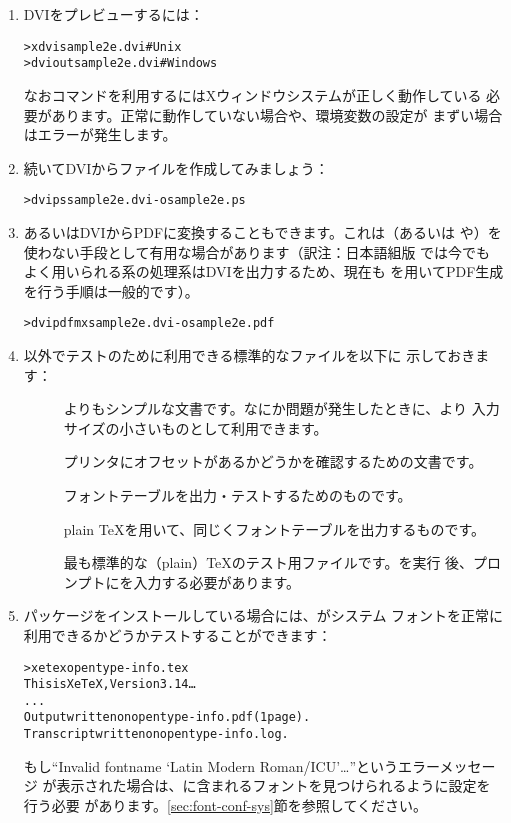 \documentclass[uplatex,dvipdfmx,12pt,tombow]{jsarticle}
\begin{document}
\begin{enumerate}
\item DVIをプレビューするには：
%
\begin{alltt}
> xdvi sample2e.dvi    # Unix
> dviout sample2e.dvi  # Windows
\end{alltt}
%
なおコマンドを利用するにはXウィンドウシステムが正しく動作している
必要があります。正常に動作していない場合や、環境変数の設定が
まずい場合はエラーが発生します。

\item 続いてDVIから\PS ファイルを作成してみましょう：
%
\begin{alltt}
> dvips sample2e.dvi -o sample2e.ps
\end{alltt}

\item あるいはDVIからPDFに変換することもできます。これは\pdfTeX （あるいは
\XeTeX や\LuaTeX）を使わない手段として有用な場合があります（訳注：日本語組版
では今でもよく用いられる\pTeX 系の処理系はDVIを出力するため、現在も
を用いてPDF生成を行う手順は一般的です）。
%
\begin{alltt}
> dvipdfmx sample2e.dvi -o sample2e.pdf
\end{alltt}

\item {}以外でテストのために利用できる標準的なファイルを以下に
示しておきます：
%
\begin{description}
\item []
よりもシンプルな文書です。なにか問題が発生したときに、より
入力サイズの小さいものとして利用できます。

\item []
プリンタにオフセットがあるかどうかを確認するための文書です。

\item []
フォントテーブルを出力・テストするためのものです。

\item []
plain \TeX を用いて、同じくフォントテーブルを出力するものです。

\item []
最も標準的な（plain）\TeX のテスト用ファイルです。を実行
後、\code{*}プロンプトにを入力する必要があります。
\end{description}

\item {}パッケージをインストールしている場合には、\XeTeX がシステム
フォントを正常に利用できるかどうかテストすることができます：
%
\begin{alltt}
> xetex opentype-info.tex
This is XeTeX, Version 3.14\dots
...
Output written on opentype-info.pdf (1 page).
Transcript written on opentype-info.log.
\end{alltt}
%
もし``Invalid fontname `Latin Modern Roman/ICU'\dots''というエラーメッセージ
が表示された場合は、\TL に含まれるフォントを見つけられるように設定を行う必要
があります。\ref{sec:font-conf-sys}節を参照してください。
\end{enumerate}
\end{document}
